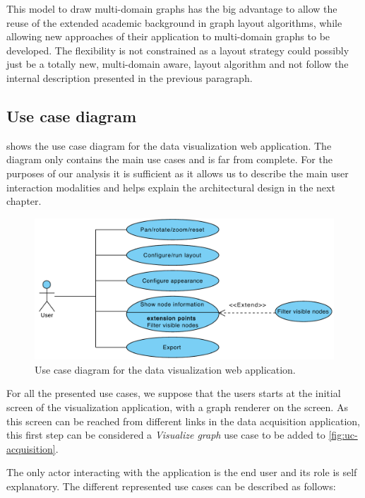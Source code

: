 This model to draw multi-domain graphs has the big advantage to allow the reuse of the extended academic background in graph layout algorithms, while allowing new approaches of their application to multi-domain graphs to be developed. The flexibility is not constrained as a layout strategy could possibly just be a totally new, multi-domain aware, layout algorithm and not follow the internal description presented in the previous paragraph.

\subsection{Use case diagram}

 shows the use case diagram for the data visualization web application. The diagram only contains the main use cases and is far from complete. For the purposes of our analysis it is sufficient as it allows us to describe the main user interaction modalities and helps explain the architectural design in the next chapter.

\begin{figure}
  \centering
  \includegraphics[width=.8\linewidth]{images/diagrams/uc-visu}
  \caption[Use case diagram for the data visualization web application.]{Use case diagram for the data visualization web application.}
  \label{fig:uc-visu}
\end{figure}

For all the presented use cases, we suppose that the users starts at the initial screen of the visualization application, with a graph renderer on the screen. As this screen can be reached from different links in the data acquisition application, this first step can be considered a \emph{Visualize graph} use case to be added to \vref{fig:uc-acquisition}.

The only actor interacting with the application is the end user and its role is self explanatory. The different represented use cases can be described as follows:

